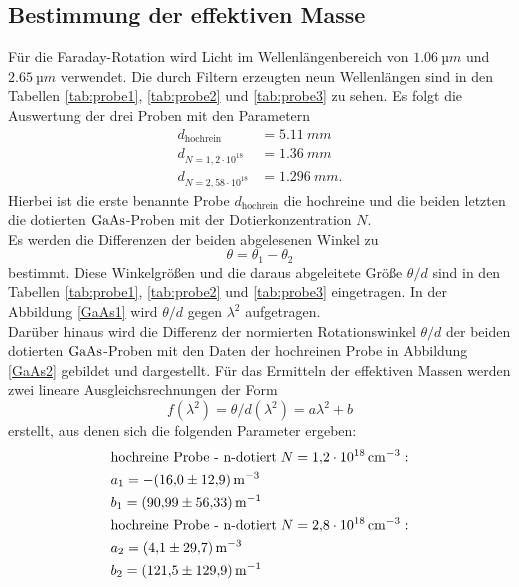 \subsection{Bestimmung der effektiven Masse}
Für die Faraday-Rotation wird Licht im Wellenlängenbereich von $\SI{1,06}{µm}$ und $\SI{2,65}{µm}$ verwendet.
Die durch Filtern erzeugten neun Wellenlängen sind in den Tabellen \ref{tab:probe1}, \ref{tab:probe2} und \ref{tab:probe3} zu sehen.
Es folgt die Auswertung der drei Proben mit den Parametern
\begin{align*}
d_\text{hochrein}&=\SI{5,11}{mm}\\
d_{N=1,2\cdot10^{18}}&=\SI{1,36}{mm}\\
d_{N=2,58\cdot10^{18}}&=\SI{1,296}{mm}.
\end{align*}
Hierbei ist die erste benannte Probe $d_\text{hochrein}$ die hochreine und die beiden letzten die dotierten $\ce{GaAs}$-Proben mit der Dotierkonzentration $N$.\\
Es werden die Differenzen der beiden abgelesenen Winkel zu
\begin{equation}
  \theta=\theta_1-\theta_2
\end{equation}
bestimmt. Diese Winkelgrößen und die daraus abgeleitete Größe $\theta/d$ sind in den Tabellen \ref{tab:probe1}, \ref{tab:probe2} und \ref{tab:probe3} eingetragen.
In der Abbildung \ref{GaAs1} wird $\theta/d$ gegen $\lambda^2$ aufgetragen.\\
Darüber hinaus wird die Differenz der normierten Rotationswinkel $\theta/d$ der beiden dotierten $\ce{GaAs}$-Proben mit den Daten der hochreinen Probe in Abbildung \ref{GaAs2} gebildet und dargestellt.
Für das Ermitteln der effektiven Massen werden zwei lineare Ausgleichsrechnungen der Form
\begin{equation}
  f(\lambda^2)=\theta/d(\lambda^2)=a\lambda^2+b
\end{equation}
erstellt, aus denen sich die folgenden Parameter ergeben:
\begin{align*}
&\text{hochreine Probe - n-dotiert}\; N=\SI{1.2e18}{\centi\meter^{-3}}:\\
&a_1=-\SI{16,0 \pm 12,9}{\meter^{-3}}\\
&b_1=\SI{90,99 \pm 56,33}{\meter^{-1}}\\
&\text{hochreine Probe - n-dotiert}\; N=\SI{2.8e18}{\centi\meter^{-3}}:\\
&a_2=\SI{4,1\pm29,7}{\meter^{-3}}\\
&b_2=\SI{121,5\pm129,9}{\meter^{-1}}
\end{align*}

